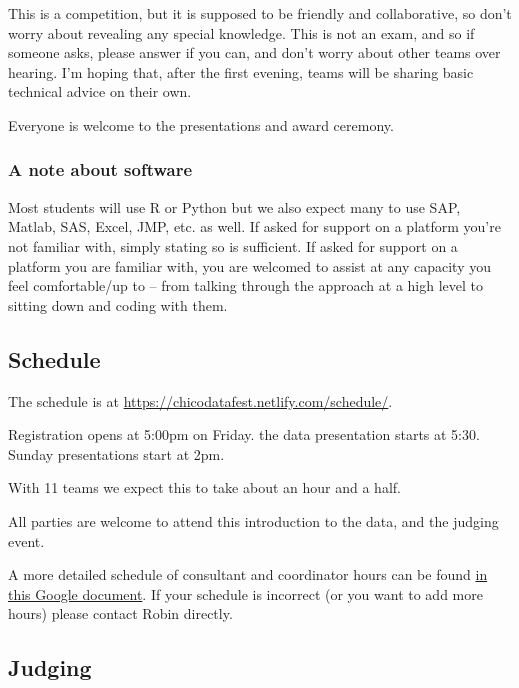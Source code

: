 \documentclass[]{article}
\begin{document}
This is a competition, but it is supposed to be friendly and
collaborative, so don't worry about revealing any special knowledge.
This is not an exam, and so if someone asks, please answer if you can,
and don't worry about other teams over hearing. I'm hoping that, after
the first evening, teams will be sharing basic technical advice on their
own.

Everyone is welcome to the presentations and award ceremony.

\hypertarget{a-note-about-software}{%
\subsubsection{A note about software}\label{a-note-about-software}}

Most students will use R or Python but we also expect many to use SAP,
Matlab, SAS, Excel, JMP, etc. as well. If asked for support on a
platform you're not familiar with, simply stating so is sufficient. If
asked for support on a platform you are familiar with, you are welcomed
to assist at any capacity you feel comfortable/up to -- from talking
through the approach at a high level to sitting down and coding with
them.

\hypertarget{schedule}{%
\subsection{Schedule}\label{schedule}}

The schedule is at \url{https://chicodatafest.netlify.com/schedule/}.

Registration opens at 5:00pm on Friday. the data presentation starts at
5:30. Sunday presentations start at 2pm.

With 11 teams we expect this to take about an hour and a half.

All parties are welcome to attend this introduction to the data, and the
judging event.

A more detailed schedule of consultant and coordinator hours can be
found
\href{https://docs.google.com/spreadsheets/d/1BA_FlTaCEctfSfXAAheNxecT38ykV2_xMJ6Ee92ek0g/edit?usp=sharing}{in
this Google document}. If your schedule is incorrect (or you want to add
more hours) please contact Robin directly.

\hypertarget{judging}{%
\subsection{Judging}\label{judging}}
\end{document}
